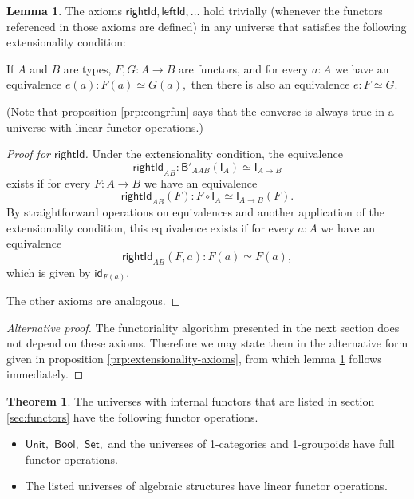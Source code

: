 \documentclass[a4paper]{article}
\theoremstyle{definition}
\newtheorem{theorem}[definition]{Theorem}
\newtheorem{lemma}[definition]{Lemma}
\theoremstyle{remark}
\renewcommand{\equiv}{\simeq}
\newcommand{\nm}{\mathsf}
\newcommand{\universe}{\nm}
\newcommand{\Unit}{\universe{Unit}}
\newcommand{\Bool}{\universe{Bool}}
\newcommand{\Set}{\universe{Set}}
\newcommand{\id}{\nm{id}}
\newcommand{\combinator}{\nm}
\newcommand{\idFun}{\combinator{I}}
\newcommand{\compFun}{\combinator{B'}}
\begin{document}
\begin{lemma}
  \label{lem:extensional}
  The axioms $\nm{rightId},\nm{leftId},\ldots$ hold trivially (whenever the functors
  referenced in those axioms are defined) in any universe that satisfies the following
  extensionality condition:

  If $A$ and $B$ are types, $F,G : A \to B$ are functors, and for every $a : A$ we have
  an equivalence $e(a) : F(a) \equiv G(a),$ then there is also an equivalence
  $e : F \equiv G.$
\end{lemma}

(Note that proposition \ref{prp:congrfun} says that the converse is always true in
a universe with linear functor operations.)

\begin{proof}[Proof for $\nm{rightId}$]
  Under the extensionality condition, the equivalence
  \[\nm{rightId}_{AB} : \compFun_{AAB}(\idFun_A) \equiv \idFun_{A{\to}B}\]
  exists if for every $F : A \to B$ we have an equivalence
  \[\nm{rightId}_{AB}(F) : F \circ \idFun_A \equiv \idFun_{A{\to}B}(F).\]
  By straightforward operations on equivalences and another application of the
  extensionality condition, this equivalence exists if for every $a : A$ we have an
  equivalence
  \[\nm{rightId}_{AB}(F,a) : F(a) \equiv F(a),\]
  which is given by $\id_{F(a)}.$

  The other axioms are analogous.
\end{proof}

\begin{proof}[Alternative proof]
  The functoriality algorithm presented in the next section does not depend on these
  axioms. Therefore we may state them in the alternative form given in proposition
  \ref{prp:extensionality-axioms}, from which lemma \ref{lem:extensional} follows
  immediately.
\end{proof}

\begin{theorem}
  \label{thm:funop}
  The universes with internal functors that are listed in section \ref{sec:functors} have the
  following functor operations.
  \begin{itemize}
    \item $\Unit,$ $\Bool,$ $\Set,$ and the universes of 1-categories and 1-groupoids have
    full functor operations.
    \item The listed universes of algebraic structures have linear functor operations.
  \end{itemize}
\end{theorem}
\end{document}
